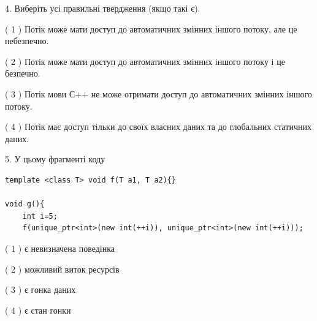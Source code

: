 \documentclass[12pt, ukrainian]{article}
\begin{document}
\begin {large}
{%
4. Виберіть усі правильні твердження (якщо такі є).\par
\vspace{2mm}

( 1 ) Потік може мати доступ до автоматичних змінних іншого потоку, але це небезпечно.%

( 2 ) Потік може мати доступ до автоматичних змінних іншого потоку і це безпечно.%

( 3 ) Потік мови С++ не може отримати доступ до автоматичних змінних іншого потоку.%

( 4 ) Потік має доступ тільки до своїх власних даних та до глобальних статичних даних.%


5. У цьому фрагменті коду
\begin{verbatim}
template <class T> void f(T a1, T a2){}

void g(){
    int i=5;
    f(unique_ptr<int>(new int(++i)), unique_ptr<int>(new int(++i)));
\end{verbatim}

( 1 ) є невизначена поведінка%

( 2 ) можливий виток ресурсів%

( 3 ) є гонка даних%

( 4 ) є стан гонки%
}
\end {large}
\end{document}
